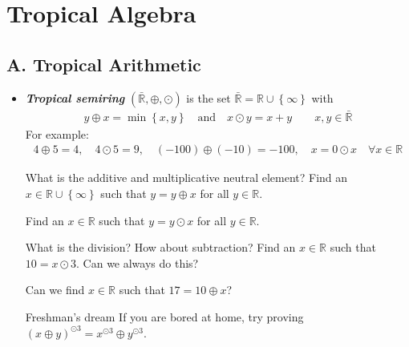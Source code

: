 \documentclass{article}
\begin{document}
\section*{Tropical Algebra}

\subsection*{A. Tropical Arithmetic}

\begin{itemize}
    \item \textbf{\emph{Tropical semiring}} \( (\bar{\mathbb{R}}, \oplus, \odot) \) is the set \( \bar{\mathbb{R}} = \mathbb{R} \cup \left\{  \infty \right\}\) with 
		\begin{gather*}
			y \oplus x = \min\left\{ x,y \right\} \quad \text{and} \quad x \odot y = x + y \qquad x,y \in \bar{\mathbb{R}} 
		\end{gather*}
		For example:
			\begin{align*}
				4 \oplus 5 = 4, \quad4 \odot 5 = 9, \quad (-100) \oplus (-10) = -100, \quad x= 0 \odot x \quad \forall x \in \mathbb{R}
			\end{align*}

		 \begin{exercise}{What is the additive and multiplicative neutral element?}{}
			Find an \( x \in \mathbb{R} \cup \left\{ \infty \right\} \) such that \( y = y \oplus x \) for all \( y \in \mathbb{R} \).

			Find an \( x \in \mathbb{R} \) such that \( y = y \odot x \) for all \( y \in \mathbb{R} \).
		 \end{exercise}
   
		 \begin{exercise}{What is the division? How about subtraction?}{}
			Find an \( x \in \mathbb{R} \) such that \( 10 = x \odot 3 \). Can we always do this?
			
			Can we find \( x \in \mathbb{R} \) such that \( 17 = 10 \oplus x \)?
		 \end{exercise}

		 \begin{exercise}{Freshman's dream}{}
			If you are bored at home, try proving \( (x \oplus y)^{\odot 3} = x^{\odot 3} \oplus y^{\odot 3} \).
		 \end{exercise}


\end{itemize}
\end{document}
